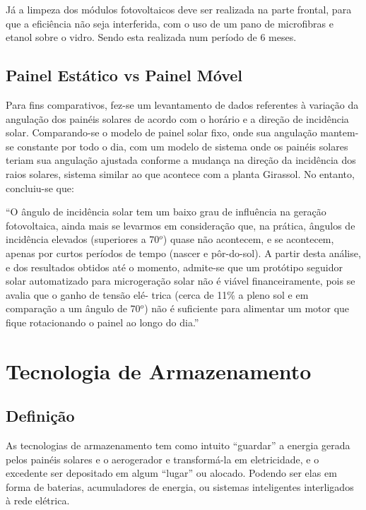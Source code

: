 	Já a limpeza dos módulos fotovoltaicos deve ser realizada na parte frontal, para que a eficiência não seja interferida, com o uso de um pano de microfibras e etanol sobre o vidro. Sendo esta realizada num período de 6 meses.

\subsection{Painel Estático vs Painel Móvel}

	Para fins comparativos, fez-se um levantamento de dados referentes à variação da angulação dos painéis solares de acordo com o horário e a direção de incidência solar. Comparando-se o modelo de painel solar fixo, onde sua angulação mantem-se constante por todo o dia, com um modelo de sistema onde os painéis solares teriam sua angulação ajustada conforme a mudança na direção da incidência dos raios solares, sistema similar ao que acontece com a planta Girassol. No entanto, concluiu-se que:

	“O ângulo de incidência solar tem um baixo grau de influência na geração fotovoltaica, ainda mais se levarmos em consideração que, na prática, ângulos de incidência elevados (superiores a 70$^o$) quase não acontecem, e se acontecem, apenas por curtos períodos de tempo (nascer e pôr-do-sol). A partir desta análise, e dos resultados obtidos até o momento, admite-se que um protótipo seguidor solar automatizado para microgeração solar não é viável financeiramente, pois se avalia que o ganho de tensão elé- trica (cerca de 11\% a pleno sol e em comparação a um ângulo de 70$^o$) não é suficiente para alimentar um motor que fique rotacionando o painel ao longo do dia.” \cite{2011PUCAMP}


\section{Tecnologia de Armazenamento}

\subsection{Definição}

	As tecnologias de armazenamento tem como intuito “guardar” a energia gerada pelos painéis solares e o aerogerador e transformá-la em eletricidade, e o excedente ser depositado em algum “lugar” ou alocado. Podendo ser elas em forma de baterias, acumuladores de energia, ou sistemas inteligentes interligados à rede elétrica.

